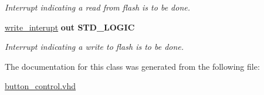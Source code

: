 \begin{DoxyCompactItemize}
\begin{DoxyCompactList}\small\item\em Interrupt indicating a read from flash is to be done. \end{DoxyCompactList}\item 
\hypertarget{classbutton__control_a976537540918c28b4b20479c41d03ac8}{\hyperlink{classbutton__control_a976537540918c28b4b20479c41d03ac8}{write\-\_\-interupt}  {\bfseries {\bfseries \textcolor{vhdlkeyword}{out}\textcolor{vhdlchar}{ }}} {\bfseries \textcolor{comment}{S\-T\-D\-\_\-\-L\-O\-G\-I\-C}\textcolor{vhdlchar}{ }} }\label{classbutton__control_a976537540918c28b4b20479c41d03ac8}

\begin{DoxyCompactList}\small\item\em Interrupt indicating a write to flash is to be done. \end{DoxyCompactList}\end{DoxyCompactItemize}


The documentation for this class was generated from the following file\-:\begin{DoxyCompactItemize}
\item 
\hyperlink{button__control_8vhd}{button\-\_\-control.\-vhd}\end{DoxyCompactItemize}
